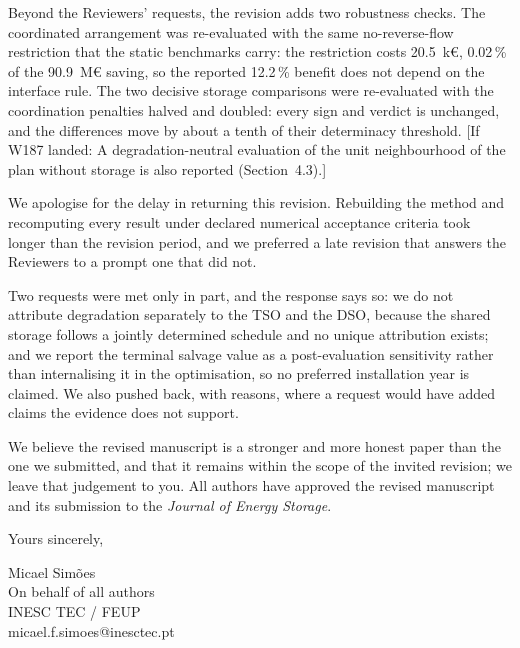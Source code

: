 \documentclass[12pt]{letter}
\begin{document}
\begin{letter}{}
    Beyond the Reviewers' requests, the revision adds two robustness checks. The coordinated arrangement was re-evaluated with the same no-reverse-flow restriction that the static benchmarks carry: the restriction costs 20.5~k\euro{}, 0.02\,\% of the 90.9~M\euro{} saving, so the reported 12.2\,\% benefit does not depend on the interface rule. The two decisive storage comparisons were re-evaluated with the coordination penalties halved and doubled: every sign and verdict is unchanged, and the differences move by about a tenth of their determinacy threshold. [If W187 landed: A degradation-neutral evaluation of the unit neighbourhood of the plan without storage is also reported (Section~4.3).]

    We apologise for the delay in returning this revision. Rebuilding the method and recomputing every result under declared numerical acceptance criteria took longer than the revision period, and we preferred a late revision that answers the Reviewers to a prompt one that did not.

    Two requests were met only in part, and the response says so: we do not attribute degradation separately to the TSO and the DSO, because the shared storage follows a jointly determined schedule and no unique attribution exists; and we report the terminal salvage value as a post-evaluation sensitivity rather than internalising it in the optimisation, so no preferred installation year is claimed. We also pushed back, with reasons, where a request would have added claims the evidence does not support.

    We believe the revised manuscript is a stronger and more honest paper than the one we submitted, and that it remains within the scope of the invited revision; we leave that judgement to you. All authors have approved the revised manuscript and its submission to the \textit{Journal of Energy Storage}.

    \closing{Yours sincerely,}
    Micael Simões\\
    On behalf of all authors\\
    INESC TEC / FEUP\\
    micael.f.simoes@inesctec.pt

\end{letter}
\end{document}
